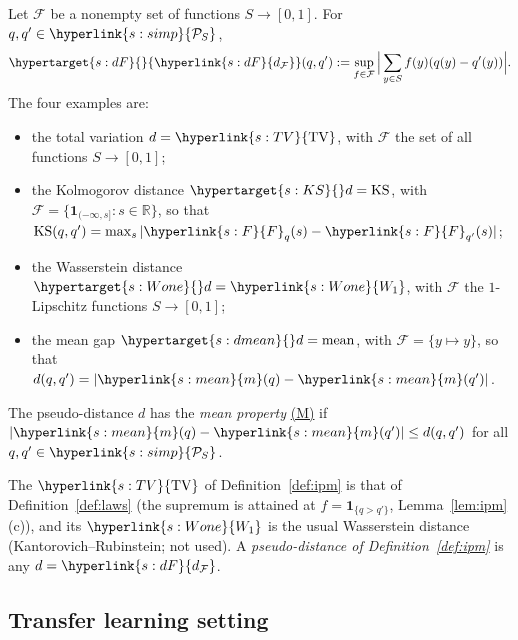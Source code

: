\documentclass[11pt]{article}
\newcommand{\ind}{\mathbf{1}}
\newcommand{\dt}[1]{\hypertarget{#1}{}}
\newcommand{\sy}[2]{{\hyperlink{#1}{#2}}}
\newcommand{\term}[2]{\hyperlink{#1}{#2}}
\newcommand{\Simp}{\sy{s:simp}{\mathcal{P}_{S}}}
\newcommand{\mean}{\sy{s:mean}{m}}
\newcommand{\Fd}{\sy{s:F}{F}}
\newcommand{\TV}{\sy{s:TV}{\mathrm{TV}}}
\newcommand{\dF}{\sy{s:dF}{d_{\mathcal F}}}
\newcommand{\Wone}{\sy{s:Wone}{W_{1}}}
\newcommand{\propM}{\term{s:M}{(M)}}
\begin{document}
\begin{definition}\label{def:ipm}
Let $\mathcal F$ be a nonempty set of functions $S\to[0,1]$. For $q,q'\in\Simp$,
\begin{equation*}
\dt{s:dF}\dF(q,q'):=\sup_{f\in\mathcal F}\Big|\sum_{y\in S}f(y)(q(y)-q'(y))\Big|.
\end{equation*}
The four examples are:
\begin{itemize}
\item the total variation $d=\TV$, with $\mathcal F$ the set of all functions $S\to[0,1]$;
\item the Kolmogorov distance $\dt{s:KS}d=\mathrm{KS}$, with
  $\mathcal F=\{\ind_{(-\infty,s]}:s\in\mathbb R\}$, so that
  $\mathrm{KS}(q,q')=\max_s|\Fd_q(s)-\Fd_{q'}(s)|$;
\item the Wasserstein distance $\dt{s:Wone}d=\Wone$, with $\mathcal F$ the $1$-Lipschitz functions
  $S\to[0,1]$;
\item the mean gap $\dt{s:dmean}d=\mathrm{mean}$, with $\mathcal F=\{y\mapsto y\}$, so that
  $d(q,q')=|\mean(q)-\mean(q')|$.
\end{itemize}
The pseudo-distance $d$ has the \emph{mean property} \dt{s:M}\propM{} if $|\mean(q)-\mean(q')|\le d(q,q')$ for
all $q,q'\in\Simp$.
\end{definition}

The $\TV$ of Definition~\ref{def:ipm} is that of Definition~\ref{def:laws} (the supremum is attained
at $f=\ind_{\{q>q'\}}$, Lemma~\ref{lem:ipm}(c)), and its $\Wone$ is the usual Wasserstein distance
(Kantorovich--Rubinstein; not used). A \emph{pseudo-distance of Definition~\ref{def:ipm}} is any
$d=\dF$.

\subsection{Transfer learning setting}
\end{document}
